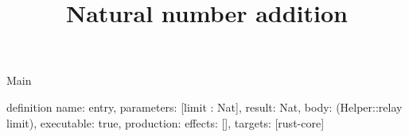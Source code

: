 \begin{lexlean}{Main}
\title{Natural number addition}
\begin{semanticmodule}
definition{
  name: entry,
  parameters: [limit : Nat],
  result: Nat,
  body: (Helper::relay limit),
  executable: true,
  production: {effects: [], targets: [rust-core]}
}
\end{semanticmodule}
\end{lexlean}
